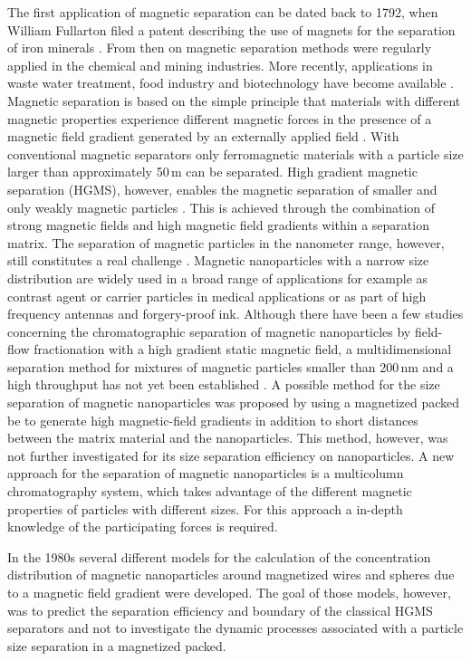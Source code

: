 The first application of magnetic separation can be dated back to 1792, when William Fullarton filed a patent describing the use of magnets for the separation of iron minerals \cite{1794repertory}. From then on magnetic separation methods were regularly applied in the chemical and mining industries. More recently, applications in waste water treatment, food industry and biotechnology have become available \cite{yavuz2009magnetic}. Magnetic separation is based on the simple principle that materials with different magnetic properties experience different magnetic forces in the presence of a magnetic field gradient generated by an externally applied field \cite{svoboda2004magnetic}. With conventional magnetic separators only ferromagnetic materials with a particle size larger than approximately 50\,\textmu m can be separated. High gradient magnetic separation (HGMS), however, enables the magnetic separation of smaller and only weakly magnetic particles \cite{frantz1937patent,ge2017magnetic}. This is achieved through the combination of strong magnetic fields and high magnetic field gradients within a separation matrix. The separation of magnetic particles in the nanometer range, however, still constitutes a real challenge \cite{mandel2012magnetic}. Magnetic nanoparticles with a narrow size distribution are widely used in a broad range of applications for example as contrast agent or carrier particles in medical applications or as part of high frequency antennas and forgery-proof ink. Although there have been a few studies concerning the chromatographic separation of magnetic nanoparticles by field-flow fractionation with a high gradient static magnetic field, a multidimensional separation method for mixtures of magnetic particles smaller than 200\,nm and a high throughput has not yet been established \cite{kim2007development,williams2009magnetic,williams2010characterization}. A possible method for the size separation of magnetic nanoparticles was proposed by \cite{nomizu1996magnetic} using a magnetized packed be to generate high magnetic-field gradients in addition to short distances between the matrix material and the nanoparticles. This method, however, was not further investigated for its size separation efficiency on nanoparticles. A new approach for the separation of magnetic nanoparticles is a multicolumn chromatography system, which takes advantage of the different magnetic properties of particles with different sizes. For this approach a in-depth knowledge of the participating forces is required.    

In the 1980s several different models for the calculation of the concentration distribution of magnetic nanoparticles around magnetized wires \cite{gerber1984magnetic,davies19902,fletcher1991fine} and spheres \cite{moyer1986filtration} due to a magnetic field gradient were developed. The goal of those models, however, was to predict the separation efficiency and boundary of the classical HGMS separators and not to investigate the dynamic processes associated with a particle size separation in a magnetized packed.

